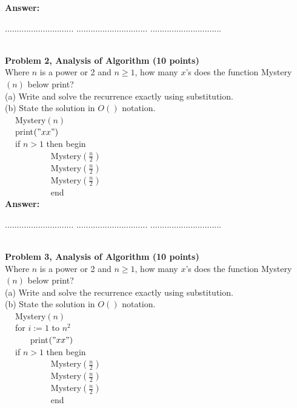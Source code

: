 \documentclass{article}
\begin{document}
\noindent
{\bf Answer:}

\pagebreak
{} $.............................$
 $..............................$
          $..............................$

\noindent
{}\\

\noindent
{\bf Problem 2, Analysis of Algorithm (10 points)}\\
Where $n$ is a power or 2 and $n \geq 1$, how many $x$'s does the function Mystery$(n)$ below print?\\
(a) Write and solve the recurrence exactly using substitution.\\
(b) State the solution in $O()$ notation. \\
$~~~~$ Mystery$(n)$\\
$~~~~$ print$("xx")$\\
$~~~~$ if $n>1 $ then begin\\
$~~~~~~~~~~~~~~~~~~~~~~~$ Mystery$\left(  \frac{n}{2}  \right)$\\
$~~~~~~~~~~~~~~~~~~~~~~~$ Mystery$\left(  \frac{n}{2}  \right)$\\
$~~~~~~~~~~~~~~~~~~~~~~~$ Mystery$\left(  \frac{n}{2}  \right)$\\
$~~~~~~~~~~~~~~~~~~~~~~~$ end\\

\noindent
{\bf Answer:}

\pagebreak
{} $.............................$
 $..............................$
          $..............................$

\noindent
{}\\

\medskip\noindent
{\bf Problem 3, Analysis of Algorithm (10 points)}\\
Where $n$ is a power or 2 and $n \geq 1$, how many $x$'s does the function Mystery$(n)$ below print?\\
(a) Write and solve the recurrence exactly using substitution.\\
(b) State the solution in $O()$ notation. \\
$~~~~$ Mystery$(n)$\\
$~~~~$ for $i:=1$ to $n^2$ \\
$~~~~~~~~~~~~$ print$("xx")$\\
$~~~~$ if $n>1 $ then begin\\
$~~~~~~~~~~~~~~~~~~~~~~~$ Mystery$\left(  \frac{n}{2}  \right)$\\
$~~~~~~~~~~~~~~~~~~~~~~~$ Mystery$\left(  \frac{n}{2}  \right)$\\
$~~~~~~~~~~~~~~~~~~~~~~~$ Mystery$\left(  \frac{n}{2}  \right)$\\
$~~~~~~~~~~~~~~~~~~~~~~~$ end\\
\end{document}
